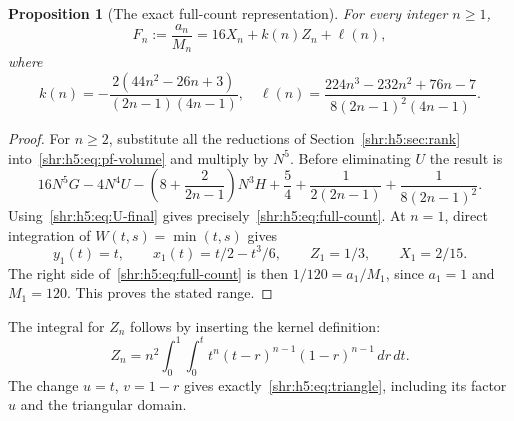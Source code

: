 \documentclass[11pt,letterpaper]{article}
\numberwithin{equation}{section}
\newtheorem{proposition}[theorem]{Proposition}
\theoremstyle{definition}
\newcommand{\1}{\mathbf 1}
\newcommand{\dd}{\,d}
\begin{document}
\begin{proposition}[The exact full-count representation]\label{shr:h5:prop:count}
For every integer $n\ge1$,
\begin{equation}
 F_n:=\frac{a_n}{M_n}=16X_n+k(n)Z_n+\ell(n),
 \label{shr:h5:eq:full-count}
\end{equation}
where
\begin{equation}
 k(n)=-\frac{2(44n^2-26n+3)}{(2n-1)(4n-1)},\quad
 \ell(n)=\frac{224n^3-232n^2+76n-7}{8(2n-1)^2(4n-1)}.
 \label{shr:h5:eq:kell}
\end{equation}
\end{proposition}
\begin{proof}
For $n\ge2$, substitute all the reductions of Section~\ref{shr:h5:sec:rank}
into~\eqref{shr:h5:eq:pf-volume} and multiply by $N^5$. Before eliminating $U$
the result is
\[
 16N^5G-4N^4U-
 \left(8+\frac2{2n-1}\right)N^3H
 +\frac54+\frac1{2(2n-1)}+\frac1{8(2n-1)^2}.
\]
Using~\eqref{shr:h5:eq:U-final} gives precisely~\eqref{shr:h5:eq:full-count}.
At $n=1$, direct integration of $W(t,s)=\min(t,s)$ gives
\begin{equation}
 y_1(t)=t,\qquad x_1(t)=t/2-t^3/6,\qquad
 Z_1=1/3,\qquad X_1=2/15.
 \label{shr:h5:eq:width-one}
\end{equation}
The right side of~\eqref{shr:h5:eq:full-count} is then $1/120=a_1/M_1$,
since $a_1=1$ and $M_1=120$. This proves the stated range.
\end{proof}

The integral for $Z_n$ follows by inserting the kernel definition:
\[
 Z_n=n^2\int_0^1\int_0^t
       t^n(t-r)^{n-1}(1-r)^{n-1}\dd r\dd t.
\]
The change $u=t$, $v=1-r$ gives exactly~\eqref{shr:h5:eq:triangle}, including
its factor $u$ and the triangular domain.
\end{document}

